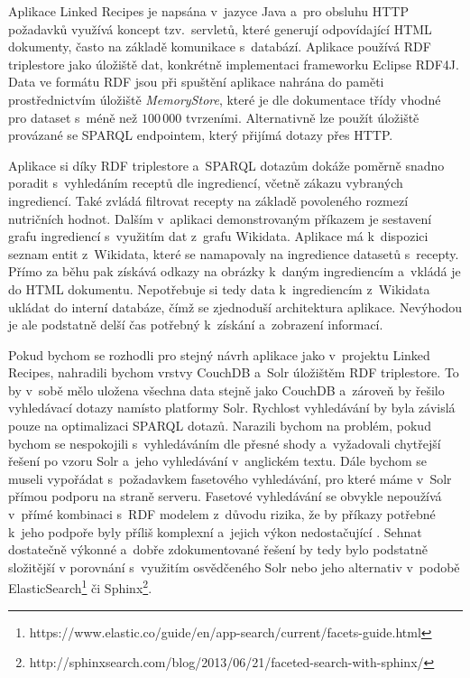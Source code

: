 Aplikace Linked Recipes je napsána v~jazyce Java a~pro obsluhu HTTP požadavků využívá koncept tzv.~servletů, které generují odpovídající HTML dokumenty, často na základě komunikace s~databází. Aplikace používá RDF triplestore jako úložiště dat, konkrétně implementaci frameworku Eclipse RDF4J. Data ve formátu RDF jsou při spuštění aplikace nahrána do paměti prostřednictvím úložiště \emph{MemoryStore}, které je dle dokumentace třídy vhodné pro dataset s~méně než $100\,000$ tvrzeními. Alternativně lze použít úložiště provázané se SPARQL endpointem, který přijímá dotazy přes HTTP.

Aplikace si díky RDF triplestore a~SPARQL dotazům dokáže poměrně snadno poradit s~vyhledáním receptů dle ingrediencí, včetně zákazu vybraných ingrediencí. Také zvládá filtrovat recepty na základě povoleného rozmezí nutričních hodnot. Dalším v~aplikaci demonstrovaným příkazem je sestavení grafu ingrediencí s~využitím dat z~grafu Wikidata. Aplikace má k~dispozici seznam entit z~Wikidata, které se namapovaly na ingredience datasetů s~recepty. Přímo za běhu pak získává odkazy na obrázky k~daným ingrediencím a~vkládá je do HTML dokumentu. Nepotřebuje si tedy data k~ingrediencím z~Wikidata ukládat do interní databáze, čímž se zjednoduší architektura aplikace. Nevýhodou je ale podstatně delší čas potřebný k~získání a~zobrazení informací.

Pokud bychom se rozhodli pro stejný návrh aplikace jako v~projektu Linked Recipes, nahradili bychom vrstvy CouchDB a~Solr úložištěm RDF triplestore. To by v~sobě mělo uložena všechna data stejně jako CouchDB a~zároveň by řešilo vyhledávací dotazy namísto platformy Solr. Rychlost vyhledávání by byla závislá pouze na optimalizaci SPARQL dotazů. Narazili bychom na problém, pokud bychom se nespokojili s~vyhledáváním dle přesné shody a~vyžadovali chytřejší řešení po vzoru Solr a~jeho vyhledávání v~anglickém textu. Dále bychom se museli vypořádat s~požadavkem fasetového vyhledávání, pro které máme v~Solr přímou podporu na straně serveru. Fasetové vyhledávání se obvykle nepoužívá v~přímé kombinaci s~RDF modelem z~důvodu rizika, že by příkazy potřebné k~jeho podpoře byly příliš komplexní a~jejich výkon nedostačující \citep{sparql-facet}. Sehnat dostatečně výkonné a~dobře zdokumentované řešení by tedy bylo podstatně složitější v porovnání s~využitím osvědčeného Solr nebo jeho alternativ v~podobě ElasticSearch\footnote{https://www.elastic.co/guide/en/app-search/current/facets-guide.html} či Sphinx\footnote{http://sphinxsearch.com/blog/2013/06/21/faceted-search-with-sphinx/}.